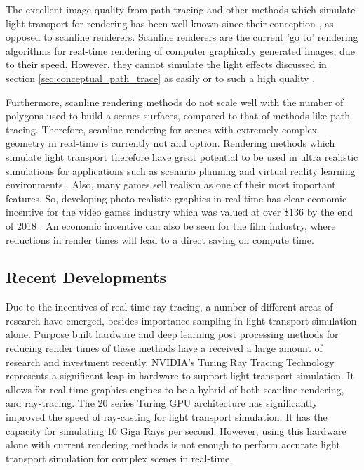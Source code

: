 \documentclass[../dissertation.tex]{subfiles}
\begin{document}
The excellent image quality from path tracing and other methods which simulate light transport for rendering has been well known since their conception \cite{kajiya1986rendering, goral1984modeling, whitted2005improved, jensen1996global}, as opposed to scanline renderers. Scanline renderers are the current 'go to' rendering algorithms for real-time rendering of computer graphically generated images, due to their speed. However, they cannot simulate the light effects discussed in section \ref{sec:conceptual_path_trace} as easily or to such a high quality \cite{wald2001state}.

Furthermore, scanline rendering methods do not scale well with the number of polygons used to build a scenes surfaces, compared to that of methods like path tracing. Therefore, scanline rendering for scenes with extremely complex geometry in real-time is currently not and option. Rendering methods which simulate light transport therefore have great potential to be used in ultra realistic simulations for applications such as scenario planning and virtual reality learning environments \cite{pan2006virtual}. Also, many games sell realism as one of their most important features. So, developing photo-realistic graphics in real-time has clear economic incentive for the video games industry which was valued at over \$$136$ by the end of 2018 \cite{bloomberg.com}. An economic incentive can also be seen for the film industry, where reductions in render times will lead to a direct saving on compute time.

\subsection{Recent Developments}
Due to the incentives of real-time ray tracing, a number of different areas of research have emerged, besides importance sampling in light transport simulation alone. Purpose built hardware and deep learning post processing methods for reducing render times of these methods have a received a large amount of research and investment recently. NVIDIA's Turing Ray Tracing Technology \cite{nvidia_turing_architecture_whitepaper_2018} represents a significant leap in hardware to support light transport simulation. It allows for real-time graphics engines to be a hybrid of both scanline rendering, and ray-tracing. The 20 series Turing GPU architecture has significantly improved the speed of ray-casting for light transport simulation. It has the capacity for  simulating 10 Giga Rays per second. However, using this hardware alone with current rendering methods is not enough to perform accurate light transport simulation for complex scenes in real-time.
\end{document}
